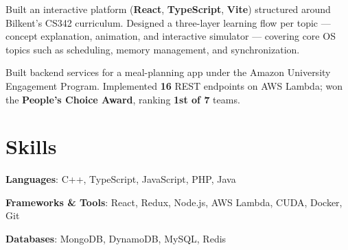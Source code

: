 {Built an interactive platform (\textbf{React}, \textbf{TypeScript}, \textbf{Vite}) structured around Bilkent's CS342 curriculum.}
\resumeItemListStart
    {Designed a three-layer learning flow per topic — concept explanation, animation, and interactive simulator — covering core OS topics such as scheduling, memory management, and synchronization.}
\resumeItemListEnd

{Built backend services for a meal-planning app under the Amazon University Engagement Program.}
\resumeItemListStart
    {Implemented \textbf{16} REST endpoints on AWS Lambda; won the \textbf{People's Choice Award}, ranking \textbf{1st of 7} teams.}
\resumeItemListEnd

  \resumeSubHeadingListEnd


\section{Skills}
 \resumeSubHeadingListStart
    \item{
      \textbf{Languages}{: C++, TypeScript, JavaScript, PHP, Java}
    }
    \item{
      \textbf{Frameworks \& Tools}{: React, Redux, Node.js, AWS Lambda, CUDA, Docker, Git}
    }
    \item{
      \textbf{Databases}{: MongoDB, DynamoDB, MySQL, Redis}
    }

 \resumeSubHeadingListEnd



